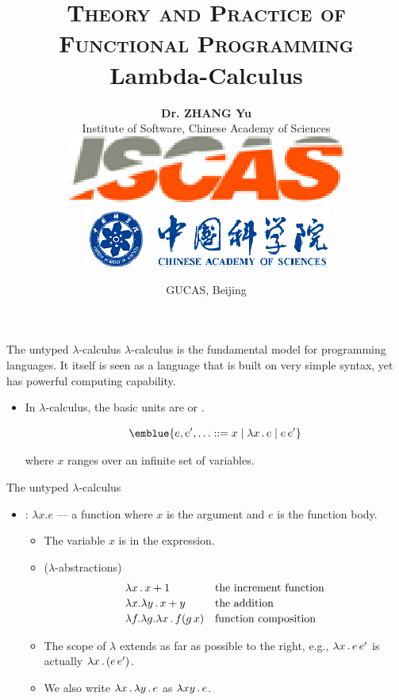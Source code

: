 \documentclass[paper=screen,mode=present,style=zysimple]{powerdot}
\title{{\small \textsc{Theory and Practice of Functional Programming}}
\\[12pt]
{\Large \color{TitleColor} Lambda-Calculus}
}
\author{\small \textbf{Dr. ZHANG Yu}
  \\[2pt] \small Institute of Software, Chinese Academy of Sciences 
  \\[5pt] \includegraphics[height=.04\slideheight]{iscas.eps} 
  \qquad \qquad 
  \includegraphics[height=.04\slideheight]{cas.eps}
}
\date{\scriptsize GUCAS, Beijing}
\begin{document}
\maketitle 


\begin{slide}{The untyped $\lambda$-calculus}
$\lambda$-calculus is the fundamental model for programming languages. 
It itself is seen as a language that is built on very simple syntax, yet has powerful computing capability. 
\begin{itemize}
\item In $\lambda$-calculus, the basic units are  or .
\begin{wrap}\vspace*{-0.5em}
\[
\emblue{e, e', \ldots :: = x \mid \lambda x \ldot e \mid e \, e'}
\vspace*{-1em}
\]
\end{wrap}
where $x$ ranges over an infinite set of variables.
\end{itemize}
\end{slide}

\begin{slide}{The untyped $\lambda$-calculus}
\begin{itemize}
\item {}: $\lambda x . e$ --- a function where $x$ is the argument and $e$ is the function body.
\begin{itemize}
\item The variable $x$ is  in the expression.  
\item \Example ($\lambda$-abstractions) 
\[
\begin{array}{l@{\quad}l}
\lambda x \ldot x + 1 & \mbox{the increment function} \\[0.2em]
\lambda x . \lambda y \ldot x + y & \mbox{the addition} \\[0.2em]
\lambda f . \lambda g . \lambda x \ldot f (g \, x) & \mbox{function composition} 
\end{array}
\]
\item The scope of $\lambda$ extends as far as possible to the right, e.g., $\lambda x \, . \, e \, e'$ is 
actually $\lambda x \, . \, (e \, e')$. 
\item We also  write $\lambda x \, . \, \lambda y \, . \, e$ as $\lambda x y \, . \, e$.
\end{itemize}
\end{itemize}
\end{slide}
\end{document}
